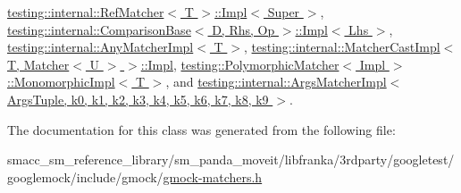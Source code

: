 \hyperlink{classtesting_1_1internal_1_1RefMatcher_3_01T_01_6_01_4_1_1Impl_ab10f996ea80e601e763c624edd6890d5}{testing\+::internal\+::\+Ref\+Matcher$<$ T $>$\+::\+Impl$<$ Super $>$}, \hyperlink{classtesting_1_1internal_1_1ComparisonBase_1_1Impl_a3d4468431bc7104b8269dedfa3a596cd}{testing\+::internal\+::\+Comparison\+Base$<$ D, Rhs, Op $>$\+::\+Impl$<$ Lhs $>$}, \hyperlink{classtesting_1_1internal_1_1AnyMatcherImpl_ac2d8f01b1c8ede16295f03eda91c5de1}{testing\+::internal\+::\+Any\+Matcher\+Impl$<$ T $>$}, \hyperlink{classtesting_1_1internal_1_1MatcherCastImpl_3_01T_00_01Matcher_3_01U_01_4_01_4_1_1Impl_acc8cbc68475bb2cb7af971ad788142fc}{testing\+::internal\+::\+Matcher\+Cast\+Impl$<$ T, Matcher$<$ U $>$ $>$\+::\+Impl}, \hyperlink{classtesting_1_1PolymorphicMatcher_1_1MonomorphicImpl_a536a47d5addc2134a3f7509a175b1580}{testing\+::\+Polymorphic\+Matcher$<$ Impl $>$\+::\+Monomorphic\+Impl$<$ T $>$}, and \hyperlink{classtesting_1_1internal_1_1ArgsMatcherImpl_a60383b3073a61f9d82cbf31fe19e6bfa}{testing\+::internal\+::\+Args\+Matcher\+Impl$<$ Args\+Tuple, k0, k1, k2, k3, k4, k5, k6, k7, k8, k9 $>$}.



The documentation for this class was generated from the following file\+:\begin{DoxyCompactItemize}
\item 
smacc\+\_\+sm\+\_\+reference\+\_\+library/sm\+\_\+panda\+\_\+moveit/libfranka/3rdparty/googletest/googlemock/include/gmock/\hyperlink{gmock-matchers_8h}{gmock-\/matchers.\+h}\end{DoxyCompactItemize}
